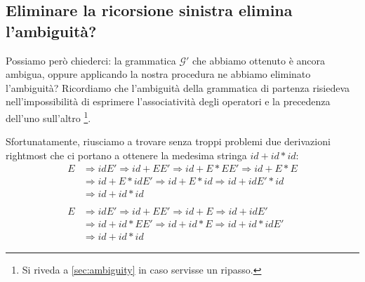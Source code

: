 \documentclass[class=book, crop=false, oneside, 12pt]{standalone}
\begin{document}
\subsection{Eliminare la ricorsione sinistra elimina l'ambiguità?}
Possiamo però chiederci: la grammatica \(\mathcal{G'}\) che abbiamo ottenuto è ancora ambigua, oppure applicando la nostra procedura ne abbiamo eliminato l'ambiguità? Ricordiamo che l'ambiguità della grammatica di partenza risiedeva nell'impossibilità di esprimere l'associatività degli operatori e la precedenza dell'uno sull'altro \footnote{Si riveda a \ref{sec:ambiguity} in caso servisse un ripasso.}. 

Sfortunatamente, riusciamo a trovare senza troppi problemi due derivazioni rightmost che ci portano a ottenere la medesima stringa \(id + id * id\):
\begin{align*}
    E &\Rightarrow idE' \Rightarrow id + EE' \Rightarrow id + E * EE' \Rightarrow id + E * E \\
        &\Rightarrow id + E * idE' \Rightarrow id + E * id \Rightarrow id + idE' * id \\
        &\Rightarrow id + id * id 
    \\ \\
    E &\Rightarrow idE' \Rightarrow id + EE' \Rightarrow id + E \Rightarrow id + idE' \\
        &\Rightarrow id + id * EE' \Rightarrow id + id * E \Rightarrow id + id * idE' \\
        &\Rightarrow id + id * id  
\end{align*}
\end{document}
